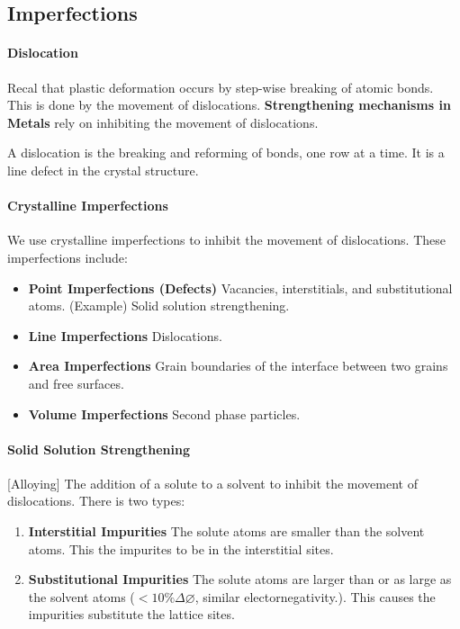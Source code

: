 \documentclass[11pt]{article}
\begin{document}
\subsection{Imperfections}
\paragraph{Dislocation} Recal that plastic deformation occurs by step-wise breaking of atomic bonds. This is done by the movement of dislocations. \textbf{Strengthening mechanisms in Metals} rely on inhibiting the movement of dislocations.
\begin{definition}[Dislocation]
    A dislocation is the breaking and reforming of bonds, one row at a time. It is a line defect in the crystal structure.
\end{definition}
\paragraph{Crystalline Imperfections} We use crystalline imperfections to inhibit the movement of dislocations. These imperfections include:
\begin{itemize}
    \item \textbf{Point Imperfections (Defects)} Vacancies, interstitials, and substitutional atoms.
    (Example) Solid solution strengthening.
    \item \textbf{Line Imperfections} Dislocations.
    \item \textbf{Area Imperfections} Grain boundaries of the interface between two grains and free surfaces.
    \item \textbf{Volume Imperfections} Second phase particles.
\end{itemize}
\paragraph{Solid Solution Strengthening} [Alloying] The addition of a solute to a solvent to inhibit the movement of dislocations. There is two types:
\begin{enumerate}
    \item \textbf{Interstitial Impurities} The solute atoms are smaller than the solvent atoms. This the impurites to be in the interstitial sites.
    \item \textbf{Substitutional Impurities} The solute atoms are larger than or as large as the solvent atoms ($<10 \% \Delta \varnothing$, similar electornegativity.). This causes the impurities substitute the lattice sites.
\end{enumerate}
\end{document}
